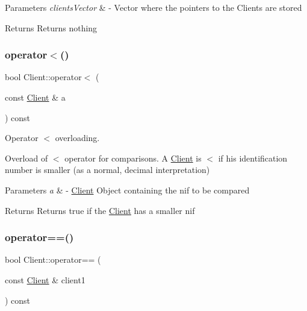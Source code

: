 \begin{DoxyParams}{Parameters}
{\em clients\+Vector} & -\/ Vector where the pointers to the Clients are stored \\
\hline
\end{DoxyParams}
\begin{DoxyReturn}{Returns}
Returns nothing 
\end{DoxyReturn}
\mbox{\label{class_client_a1cbbbf2ea0d65791314b7640c053197b}} 
\subsubsection{\texorpdfstring{operator$<$()}{operator<()}}
{\footnotesize\ttfamily bool Client\+::operator$<$ (\begin{DoxyParamCaption}\item[{const \hyperlink{class_client}{Client} \&}]{a }\end{DoxyParamCaption}) const}



Operator $<$ overloading. 

Overload of $<$ operator for comparisons. A \hyperlink{class_client}{Client} is $<$ if his identification number is smaller (as a normal, decimal interpretation)


\begin{DoxyParams}{Parameters}
{\em a} & -\/ \hyperlink{class_client}{Client} Object containing the nif to be compared \\
\hline
\end{DoxyParams}
\begin{DoxyReturn}{Returns}
Returns true if the \hyperlink{class_client}{Client} has a smaller nif 
\end{DoxyReturn}
\mbox{\label{class_client_a5cc669077f776648216ae03461b8c178}} 
\subsubsection{\texorpdfstring{operator==()}{operator==()}}
{\footnotesize\ttfamily bool Client\+::operator== (\begin{DoxyParamCaption}\item[{const \hyperlink{class_client}{Client} \&}]{client1 }\end{DoxyParamCaption}) const}



